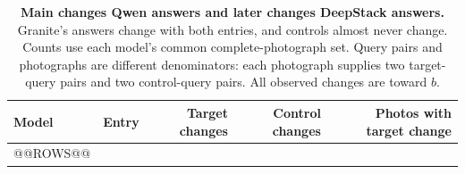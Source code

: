 \begin{table}[t]
\centering\footnotesize
\caption{\textbf{Main changes Qwen answers and later changes DeepStack answers.} Granite's answers change with both entries, and controls almost never change. Counts use each model's common complete-photograph set. Query pairs and photographs are different denominators: each photograph supplies two target-query pairs and two control-query pairs. All observed changes are toward $b$.}
\begin{tabular}{@{}llrrr@{}}
\toprule
\rowcolor{DSTableHeader}
Model & Entry & Target changes & Control changes & Photos with target change \\
\midrule
@@ROWS@@
\bottomrule
\end{tabular}
\label{tab:reference_transitions}
\end{table}
